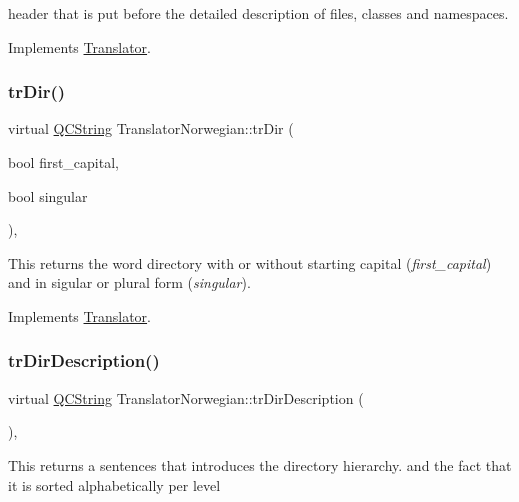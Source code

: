 header that is put before the detailed description of files, classes and namespaces. 

Implements \mbox{\hyperlink{class_translator}{Translator}}.

\mbox{\label{class_translator_norwegian_a460793e99d45997ac35f98ffbfa447c1}} 
\subsubsection{\texorpdfstring{trDir()}{trDir()}}
{\footnotesize\ttfamily virtual \mbox{\hyperlink{class_q_c_string}{Q\+C\+String}} Translator\+Norwegian\+::tr\+Dir (\begin{DoxyParamCaption}\item[{bool}]{first\+\_\+capital,  }\item[{bool}]{singular }\end{DoxyParamCaption})\hspace{0.3cm}{\ttfamily [inline]}, {\ttfamily [virtual]}}

This returns the word directory with or without starting capital ({\itshape first\+\_\+capital}) and in sigular or plural form ({\itshape singular}). 

Implements \mbox{\hyperlink{class_translator}{Translator}}.

\mbox{\label{class_translator_norwegian_a41b6a277e42ca439c34de6fecace9118}} 
\subsubsection{\texorpdfstring{trDirDescription()}{trDirDescription()}}
{\footnotesize\ttfamily virtual \mbox{\hyperlink{class_q_c_string}{Q\+C\+String}} Translator\+Norwegian\+::tr\+Dir\+Description (\begin{DoxyParamCaption}{ }\end{DoxyParamCaption})\hspace{0.3cm}{\ttfamily [inline]}, {\ttfamily [virtual]}}

This returns a sentences that introduces the directory hierarchy. and the fact that it is sorted alphabetically per level 


